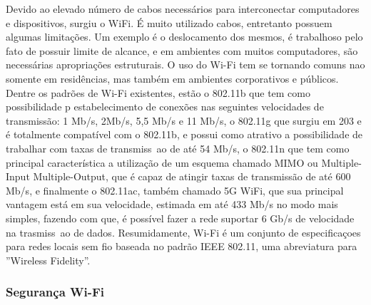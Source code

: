 \documentclass[journal]{IEEEtran}
\begin{document}
Devido ao elevado número de cabos necessários para interconectar computadores e dispositivos, surgiu o WiFi. É muito utilizado cabos, entretanto possuem algumas limitações. Um exemplo é o deslocamento dos mesmos, é trabalhoso pelo fato de possuir limite de alcance, e em ambientes com muitos computadores, são necessárias apropriações estruturais. O uso do Wi-Fi tem se tornando comuns nao somente em residências, mas também em ambientes corporativos e públicos. Dentre os padrões de Wi-Fi existentes, estão o 802.11b que tem como possibilidade p estabelecimento de conexões nas seguintes velocidades de transmissão: 1 Mb/s, 2Mb/s, 5,5 Mb/s e 11 Mb/s, o 802.11g que surgiu em 203 e é totalmente compatível com o 802.11b, e possui como atrativo a possibilidade de trabalhar com taxas de transmiss~ao de até 54 Mb/s, o 802.11n que tem como principal característica a utilização de um esquema chamado MIMO ou Multiple-Input Multiple-Output, que é capaz de atingir taxas de transmissão de até 600 Mb/s, e finalmente o 802.11ac, também chamado 5G WiFi, que sua principal vantagem está em sua velocidade, estimada em até 433 Mb/s no modo mais simples, fazendo com que, é possível fazer a rede suportar 6 Gb/s  de velocidade na trasmiss~ao de dados. Resumidamente, Wi-Fi é um conjunto de especificaçoes para redes locais sem fio baseada no padrão IEEE 802.11, uma abreviatura para ''Wireless Fidelity''. \cite{wifiinfowester}

\subsubsection{Segurança Wi-Fi}
\end{document}
